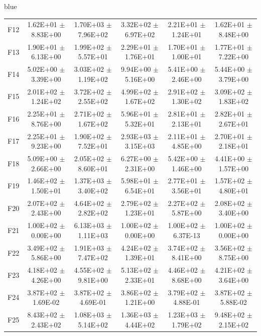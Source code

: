 \documentclass[journal, onecolumn]{IEEEtran}
\begin{document}
\begin{color}{blue}
\begin{table}[htbp!]
\begin{tabular}{c|ccccc}
		F12	 &	1.62E+01	$\pm$	8.83E+00	 &	1.70E+03	$\pm$	7.96E+02		 &	3.32E+02	$\pm$	6.97E+02		 &	2.21E+01	$\pm$	1.24E+01		 &	1.62E+01	$\pm$	8.48E+00	\\	
		F13	 &	1.90E+01	$\pm$	6.13E+00	 &	1.99E+02	$\pm$	5.57E+01		 &	2.29E+01	$\pm$	1.76E+01		 &	1.70E+01	$\pm$	1.00E+01		 &	1.77E+01	$\pm$	7.22E+00	\\	
		F14	 &	5.02E+00	$\pm$	3.39E+00	 &	3.03E+02	$\pm$	1.19E+02		 &	9.94E+00	$\pm$	5.16E+00		 &	5.41E+00	$\pm$	2.46E+00		 &	5.44E+00	$\pm$	3.79E+00	\\	
		F15	 &	2.01E+02	$\pm$	1.24E+02	 &	3.72E+02	$\pm$	2.55E+02		 &	4.99E+02	$\pm$	1.67E+02		 &	2.91E+02	$\pm$	1.30E+02		 &	3.09E+02	$\pm$	1.83E+02	\\	
		F16	 &	2.25E+01	$\pm$	8.76E+00	 &	2.71E+02	$\pm$	1.67E+02		 &	5.96E+01	$\pm$	5.32E+01		 &	2.81E+01	$\pm$	2.13E+01		 &	2.82E+01	$\pm$	2.67E+01	\\	
		F17	 &	2.25E+01	$\pm$	9.23E+00	 &	1.90E+02	$\pm$	7.52E+01		 &	2.93E+03	$\pm$	3.15E+03		 &	2.11E+01	$\pm$	4.85E+00		 &	2.70E+01	$\pm$	2.18E+01	\\	
		F18	 &	5.09E+00	$\pm$	2.66E+00	 &	2.05E+02	$\pm$	8.60E+01		 &	6.27E+00	$\pm$	2.31E+00		 &	5.42E+00	$\pm$	1.46E+00		 &	4.41E+00	$\pm$	1.57E+00	\\	
		F19	 &	1.46E+02	$\pm$	1.50E+01	 &	1.37E+03	$\pm$	3.40E+02		 &	5.98E+01	$\pm$	6.54E+01		 &	2.77E+01	$\pm$	3.56E+01		 &	1.57E+02	$\pm$	4.80E+01	\\	
		F20	 &	2.07E+02	$\pm$	2.43E+00	 &	4.64E+02	$\pm$	2.82E+02		 &	2.79E+02	$\pm$	1.23E+01		 &	2.27E+02	$\pm$	5.87E+00		 &	2.08E+02	$\pm$	3.40E+00	\\	
		F21	 &	1.00E+02	$\pm$	0.00E+00	 &	6.13E+03	$\pm$	1.11E+03		 &	1.00E+02	$\pm$	0.00E+00		 &	1.00E+02	$\pm$	6.37E-13		 &	1.00E+02	$\pm$	0.00E+00	\\	
		F22	 &	3.49E+02	$\pm$	5.86E+00	 &	1.91E+03	$\pm$	7.47E+02		 &	4.24E+02	$\pm$	1.39E+01		 &	3.74E+02	$\pm$	8.41E+00		 &	3.56E+02	$\pm$	8.75E+00	\\	
		F23	 &	4.18E+02	$\pm$	4.26E+00	 &	4.55E+02	$\pm$	9.81E+00		 &	5.13E+02	$\pm$	2.33E+01		 &	4.46E+02	$\pm$	8.68E+00		 &	4.21E+02	$\pm$	3.64E+00	\\	
		F24	 &	3.87E+02	$\pm$	1.69E-02	 &	3.87E+02	$\pm$	4.69E-01		 &	3.86E+02	$\pm$	1.21E+00		 &	3.79E+02	$\pm$	4.88E-01		 &	3.87E+02	$\pm$	5.88E-02	\\	
		F25	 &	8.43E+02	$\pm$	2.43E+02	 &	1.08E+03	$\pm$	5.14E+02		 &	1.36E+03	$\pm$	4.44E+02		 &	1.23E+03	$\pm$	1.79E+02		 &	9.48E+02	$\pm$	2.15E+02	\\	

\end{tabular}
\end{table}
\end{color}
\end{document}
